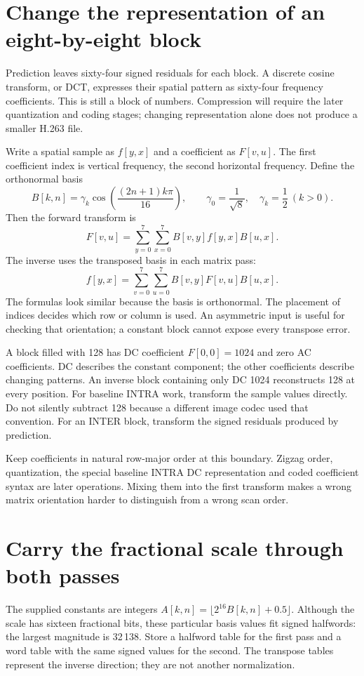 \section{Change the representation of an eight-by-eight block}
Prediction leaves sixty-four signed residuals for each block. A discrete cosine
transform, or DCT, expresses their spatial pattern as sixty-four frequency
coefficients. This is still a block of numbers. Compression will require the
later quantization and coding stages; changing representation alone does not
produce a smaller H.263 file.

Write a spatial sample as $f[y,x]$ and a coefficient as $F[v,u]$. The first
coefficient index is vertical frequency, the second horizontal frequency.
Define the orthonormal basis
\[
 B[k,n]=\gamma_k\cos\!\left(\frac{(2n+1)k\pi}{16}\right),\qquad
 \gamma_0=\frac{1}{\sqrt8},\quad \gamma_k=\frac12\ (k>0).
\]
Then the forward transform is
\[
 F[v,u]=\sum_{y=0}^{7}\sum_{x=0}^{7}B[v,y]f[y,x]B[u,x].
\]
The inverse uses the transposed basis in each matrix pass:
\[
 f[y,x]=\sum_{v=0}^{7}\sum_{u=0}^{7}B[v,y]F[v,u]B[u,x].
\]
The formulas look similar because the basis is orthonormal. The placement of
indices decides which row or column is used. An asymmetric input is useful for
checking that orientation; a constant block cannot expose every transpose error.

A block filled with 128 has DC coefficient $F[0,0]=1024$ and zero AC coefficients.
DC describes the constant component; the other coefficients describe changing
patterns. An inverse block containing only DC 1024 reconstructs 128 at every
position. For baseline INTRA work, transform the sample values directly. Do not
silently subtract 128 because a different image codec used that convention.
For an INTER block, transform the signed residuals produced by prediction.

Keep coefficients in natural row-major order at this boundary. Zigzag order,
quantization, the special baseline INTRA DC representation and coded coefficient
syntax are later operations. Mixing them into the first transform makes a wrong
matrix orientation harder to distinguish from a wrong scan order.

\section{Carry the fractional scale through both passes}
The supplied constants are integers
$A[k,n]=\lfloor 2^{16}B[k,n]+0.5\rfloor$. Although the scale has sixteen
fractional bits, these particular basis values fit signed halfwords: the largest
magnitude is 32\,138. Store a halfword table for the first pass and a word table
with the same signed values for the second. The transpose tables represent the
inverse direction; they are not another normalization.

